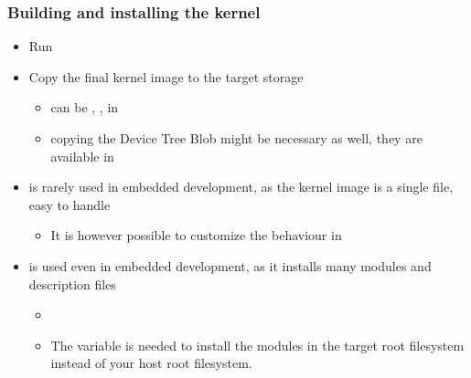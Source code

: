 \begin{frame}
  \frametitle{Building and installing the kernel}
  \begin{itemize}
  \item Run 
  \item Copy the final kernel image to the target storage
    \begin{itemize}
    \item can be , ,
       in 
    \item copying the Device Tree Blob might be necessary as well,
      they are available in 
    \end{itemize}
  \item {} is rarely used in embedded development, as the
    kernel image is a single file, easy to handle
    \begin{itemize}
    \item It is however possible to customize the 
      behaviour in 
    \end{itemize}
  \item {} is used even in embedded
    development, as it installs many modules and description files
    \begin{itemize}
    \item {}
    \item The  variable is needed to install
      the modules in the target root filesystem instead of your host
      root filesystem.
    \end{itemize}
  \end{itemize}
\end{frame}

